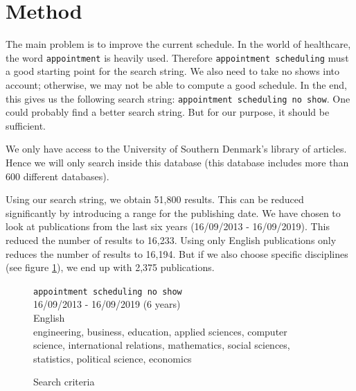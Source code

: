 \documentclass[a4paper,12pt]{article}
\begin{document}
\bigbreak

\section{Method}

The main problem is to improve the current schedule. In the world of healthcare, the word \texttt{appointment} is heavily used. Therefore \texttt{appointment scheduling} must a good starting point for the search string. We also need to take no shows into account; otherwise, we may not be able to compute a good schedule. In the end, this gives us the following search string: \texttt{appointment scheduling no show}. One could probably find a better search string. But for our purpose, it should be sufficient.

\bigbreak

We only have access to the University of Southern Denmark's library of articles. Hence we will only search inside this database (this database includes more than 600 different databases).

\bigbreak

Using our search string, we obtain 51,800 results. This can be reduced significantly by introducing a range for the publishing date. We have chosen to look at publications from the last six years (16/09/2013 - 16/09/2019). This reduced the number of results to 16,233. Using only English publications only reduces the number of results to 16,194. But if we also choose specific disciplines (see figure \ref{search-criteria}), we end up with 2,375 publications.

\bigbreak

\begin{figure}[H]
    \begin{framed}
         \texttt{appointment scheduling no show} \\
         16/09/2013 - 16/09/2019 (6 years) \\
         English \\
         engineering, business, education, applied sciences, computer \\ \makebox[3.7cm][l]{} science, international relations, mathematics, social sciences, \\ \makebox[3.7cm][l]{} statistics, political science, economics
    \end{framed}
    \caption{Search criteria}
    \label{search-criteria}
\end{figure}
\end{document}
